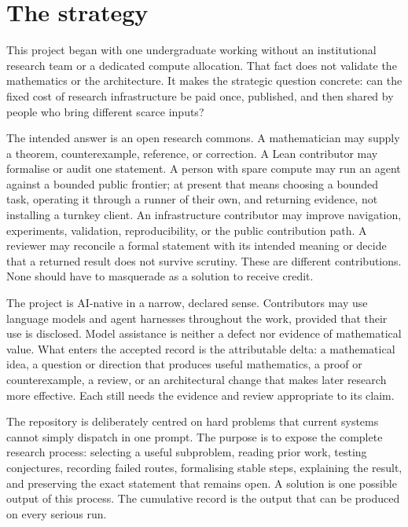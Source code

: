 \documentclass[10pt]{article}
\begin{document}
\section{The strategy}\label{sec:strategy}

This project began with one undergraduate working without an institutional
research team or a dedicated compute allocation.  That fact does not validate
the mathematics or the architecture.  It makes the strategic question
concrete: can the fixed cost of research infrastructure be paid once,
published, and then shared by people who bring different scarce inputs?

The intended answer is an open research commons.  A mathematician may supply
a theorem, counterexample, reference, or correction.  A Lean contributor may
formalise or audit one statement.  A person with spare compute may run an
agent against a bounded public frontier; at present that means choosing a
bounded task, operating it through a runner of their own, and returning
evidence, not installing a turnkey client.  An infrastructure contributor may
improve navigation, experiments, validation, reproducibility, or the public
contribution path.  A reviewer may reconcile a formal statement with its
intended meaning or decide that a returned result does not survive scrutiny.
These are different contributions.  None should have to masquerade as a
solution to receive credit.

The project is AI-native in a narrow, declared sense.  Contributors may use
language models and agent harnesses throughout the work, provided that their
use is disclosed.  Model assistance is neither a defect nor evidence of
mathematical value.  What enters the accepted record is the attributable
delta: a mathematical idea, a question or direction that produces useful
mathematics, a proof or counterexample, a review, or an architectural change
that makes later research more effective.  Each still needs the evidence and
review appropriate to its claim.

The repository is deliberately centred on hard problems that current systems
cannot simply dispatch in one prompt.  The purpose is to expose the complete
research process: selecting a useful subproblem, reading prior work, testing
conjectures, recording failed routes, formalising stable steps, explaining the
result, and preserving the exact statement that remains open.  A solution is
one possible output of this process.  The cumulative record is the output that
can be produced on every serious run.
\end{document}
